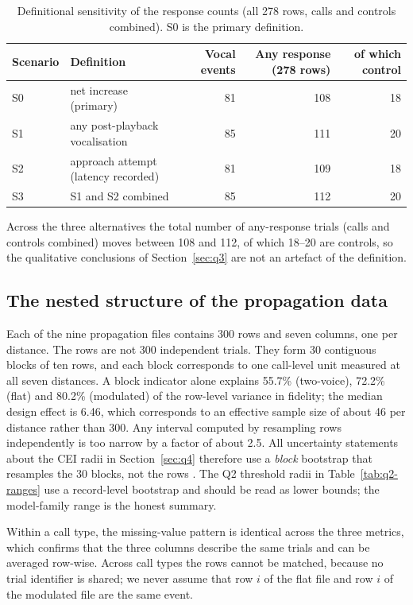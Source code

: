 \begin{table}[htbp]
  \centering
  \caption{Definitional sensitivity of the response counts (all 278 rows, calls and controls
  combined). S0 is the primary definition.}\label{tab:defsens}
  \small
  \begin{tabular}{llrrr}
    \toprule
    Scenario & Definition & Vocal events & Any response (278 rows) & of which control \\
    \midrule
    S0 & net increase (primary) & 81 & 108 & 18 \\
    S1 & any post-playback vocalisation & 85 & 111 & 20 \\
    S2 & approach attempt (latency recorded) & 81 & 109 & 18 \\
    S3 & S1 and S2 combined & 85 & 112 & 20 \\
    \bottomrule
  \end{tabular}
\end{table}

Across the three alternatives the total number of any-response trials (calls and controls
combined) moves between 108 and 112, of which 18--20 are controls, so the qualitative conclusions
of Section~\ref{sec:q3} are not an artefact of the definition.

\subsection{The nested structure of the propagation data}

Each of the nine propagation files contains 300 rows and seven columns, one per distance. The
rows are not 300 independent trials. They form 30 contiguous blocks of ten rows, and each block
corresponds to one call-level unit measured at all seven distances. A block indicator alone
explains 55.7\% (two-voice), 72.2\% (flat) and 80.2\% (modulated) of the row-level variance in
fidelity; the median design effect is 6.46, which corresponds to an effective sample size of
about 46 per distance rather than 300. Any interval computed by resampling rows independently is
too narrow by a factor of about 2.5. All uncertainty statements about the CEI radii in
Section~\ref{sec:q4} therefore use a \emph{block} bootstrap that resamples the 30 blocks, not
the rows \cite{ref7}. The Q2 threshold radii in Table~\ref{tab:q2-ranges} use a record-level bootstrap and
should be read as lower bounds; the model-family range is the honest summary.

Within a call type, the missing-value pattern is identical across the three metrics, which
confirms that the three columns describe the same trials and can be averaged row-wise. Across
call types the rows cannot be matched, because no trial identifier is shared; we never assume that
row $i$ of the flat file and row $i$ of the modulated file are the same event.

